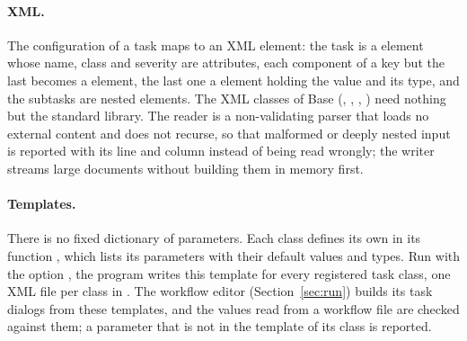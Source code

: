 \paragraph{XML.}
The configuration of a task maps to an XML element: the task is a  element whose name, class and severity
are attributes, each component of a key but the last becomes a  element, the last one a 
element holding the value and its type, and the subtasks are nested  elements. The XML classes of Base
(, , , ) need nothing but the standard library. The
reader is a non-validating parser that loads no external content and does not recurse, so that malformed or deeply
nested input is reported with its line and column instead of being read wrongly; the writer streams large documents
without building them in memory first.

\paragraph{Templates.}
There is no fixed dictionary of parameters. Each class defines its own in its function
, which lists its parameters with their default values and types. Run with the option , the  program writes this
template for every registered task class, one XML file per class in . The workflow editor 
(Section~\ref{sec:run}) builds its task dialogs from these templates, and the values read from a workflow file are
checked against them; a parameter that is not in the template of its class is reported.

